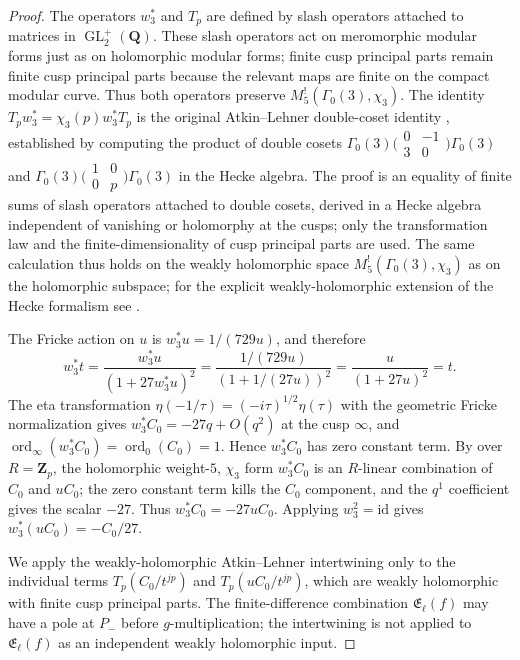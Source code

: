 \documentclass[11pt]{amsart}
\theoremstyle{definition}
\theoremstyle{remark}
\newcommand{\Q}{\mathbf{Q}}
\newcommand{\Z}{\mathbf{Z}}
\begin{document}
\begin{proof}
The operators $w_3^*$ and $T_p$ are defined by slash operators attached to matrices in $\operatorname{GL}_2^+(\Q)$. These slash operators act on meromorphic modular forms just as on holomorphic modular forms; finite cusp principal parts remain finite cusp principal parts because the relevant maps are finite on the compact modular curve. Thus both operators preserve $M_5^!(\Gamma_0(3),\chi_3)$. The identity $T_p w_3^*=\chi_3(p)w_3^*T_p$ is the original Atkin--Lehner double-coset identity \cite[\S 5, equation~(58) and Theorem~3]{AtkinLehner70}, established by computing the product of double cosets $\Gamma_0(3)\bigl(\begin{smallmatrix}0&-1\\3&0\end{smallmatrix}\bigr)\Gamma_0(3)$ and $\Gamma_0(3)\bigl(\begin{smallmatrix}1&0\\0&p\end{smallmatrix}\bigr)\Gamma_0(3)$ in the Hecke algebra. The proof is an equality of finite sums of slash operators attached to double cosets, derived in a Hecke algebra independent of vanishing or holomorphy at the cusps; only the transformation law and the finite-dimensionality of cusp principal parts are used. The same calculation thus holds on the weakly holomorphic space $M_5^!(\Gamma_0(3),\chi_3)$ as on the holomorphic subspace; for the explicit weakly-holomorphic extension of the Hecke formalism see \cite[\S 2]{Guerzhoy08}.

The Fricke action on $u$ is $w_3^*u=1/(729u)$, and therefore
\[
w_3^*t=\frac{w_3^*u}{(1+27w_3^*u)^2}=\frac{1/(729u)}{(1+1/(27u))^2}=\frac{u}{(1+27u)^2}=t.
\]
The eta transformation $\eta(-1/\tau)=(-i\tau)^{1/2}\eta(\tau)$ with the geometric Fricke normalization gives $w_3^*C_0=-27q+O(q^2)$ at the cusp $\infty$, and $\operatorname{ord}_\infty(w_3^*C_0)=\operatorname{ord}_0(C_0)=1$. Hence $w_3^*C_0$ has zero constant term. By  over $R=\Z_p$, the holomorphic weight-$5$, $\chi_3$ form $w_3^*C_0$ is an $R$-linear combination of $C_0$ and $uC_0$; the zero constant term kills the $C_0$ component, and the $q^1$ coefficient gives the scalar $-27$. Thus $w_3^*C_0=-27uC_0$. Applying $w_3^2=\mathrm{id}$ gives $w_3^*(uC_0)=-C_0/27$.

We apply the weakly-holomorphic Atkin--Lehner intertwining only to the individual terms $T_p(C_0/t^{jp})$ and $T_p(uC_0/t^{jp})$, which are weakly holomorphic with finite cusp principal parts. The finite-difference combination $\mathfrak E_\ell(f)$ may have a pole at $P_-$ before $g$-multiplication; the intertwining is not applied to $\mathfrak E_\ell(f)$ as an independent weakly holomorphic input.


\end{proof}
\end{document}
